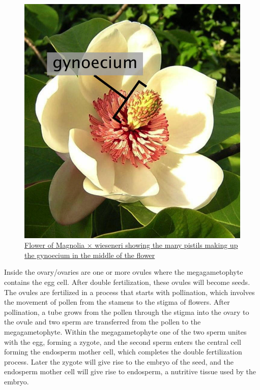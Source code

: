 \begin{figure}

{\centering \includegraphics[width=0.7\linewidth]{./figures/plants/Magnolia_wieseneri_-_labelled_gynoecium} 

}

\caption{\href{https://commons.wikimedia.org/wiki/File:Magnolia_wieseneri_-_labelled_gynoecium.jpg}{Flower of Magnolia × wieseneri showing the many pistils making up the gynoecium in the middle of the flower}}\label{fig:gynoecium}
\end{figure}

Inside the ovary/ovaries are one or more ovules where the megagametophyte contains the egg cell. After double fertilization, these ovules will become seeds. The ovules are fertilized in a process that starts with pollination, which involves the movement of pollen from the stamens to the stigma of flowers. After pollination, a tube grows from the pollen through the stigma into the ovary to the ovule and two sperm are transferred from the pollen to the megagametophyte. Within the megagametophyte one of the two sperm unites with the egg, forming a zygote, and the second sperm enters the central cell forming the endosperm mother cell, which completes the double fertilization process. Later the zygote will give rise to the embryo of the seed, and the endosperm mother cell will give rise to endosperm, a nutritive tissue used by the embryo.



